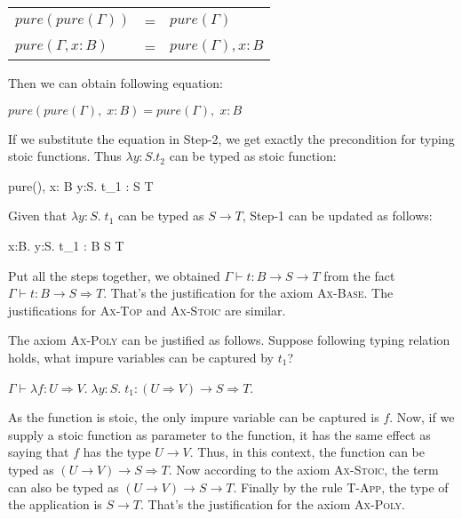\begin{center}
\begin{tabular}{l c l}
$pure(pure(\Gamma))$ & = & $pure(\Gamma)$ \\
$pure(\Gamma, x:B)$ & = & $pure(\Gamma), x:B$
\end{tabular}
\end{center}

Then we can obtain following equation:

\begin{center}
  $pure(pure(\Gamma),\; x: B) = pure(\Gamma),\; x: B$
\end{center}

If we substitute the equation in Step-2, we get exactly the
precondition for typing stoic functions. Thus $\lambda y:S.t_2$ can be
typed as stoic function:

{ pure(\Gamma),\; x: B \vdash \lambda y:S. \; t_1 : S \to T }

Given that $\lambda y:S. \; t_1$ can be typed as $S \to T$, Step-1 can
be updated as follows:

{ \Gamma \vdash \lambda x:B. \lambda y:S. \; t_1 : B \to S \to T }

Put all the steps together, we obtained
$\Gamma \vdash t : B \to S \to T$ from the fact
$\Gamma \vdash t : B \to S \Rightarrow T$. That's the justification
for the axiom \textsc{Ax-Base}. The justifications for \textsc{Ax-Top}
and \textsc{Ax-Stoic} are similar.

The axiom \textsc{Ax-Poly} can be justified as follows. Suppose
following typing relation holds, what impure variables can be captured
by $t_1$?

\begin{center}
  $\Gamma \vdash \lambda f:U \Rightarrow V. \; \lambda y:S. \; t_1 : (U
  \Rightarrow V) \to S \Rightarrow T$.
\end{center}

As the function is stoic, the only impure variable can be captured is
$f$. Now, if we supply a stoic function as parameter to the function,
it has the same effect as saying that $f$ has the type $U \to V$.
Thus, in this context, the function can be typed as
$(U \to V) \to S \Rightarrow T$.  Now according to the axiom
\textsc{Ax-Stoic}, the term can also be typed as
$(U \to V) \to S \to T$. Finally by the rule \textsc{T-App}, the type
of the application is $S \to T$. That's the justification for the
axiom \textsc{Ax-Poly}.

